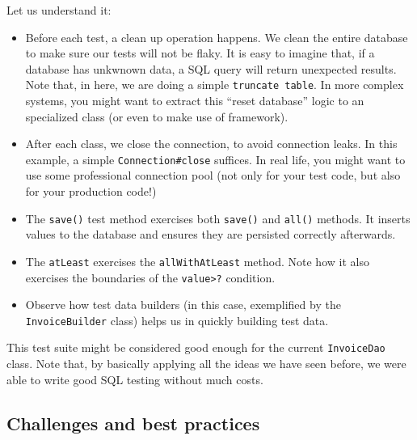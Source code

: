 \begin{Shaded}
\begin{Highlighting}[]

\NormalTok{    \}}
\NormalTok{\}}
\end{Highlighting}
\end{Shaded}

Let us understand it:

\begin{itemize}
\tightlist
\item
  Before each test, a clean up operation happens. We clean the entire
  database to make sure our tests will not be flaky. It is easy to
  imagine that, if a database has unkwnown data, a SQL query will return
  unexpected results. Note that, in here, we are doing a simple
  \texttt{truncate\ table}. In more complex systems, you might want to
  extract this ``reset database'' logic to an specialized class (or even
  to make use of framework).
\item
  After each class, we close the connection, to avoid connection leaks.
  In this example, a simple \texttt{Connection\#close} suffices. In real
  life, you might want to use some professional connection pool (not
  only for your test code, but also for your production code!)
\item
  The \texttt{save()} test method exercises both \texttt{save()} and
  \texttt{all()} methods. It inserts values to the database and ensures
  they are persisted correctly afterwards.
\item
  The \texttt{atLeast} exercises the \texttt{allWithAtLeast} method.
  Note how it also exercises the boundaries of the
  \texttt{value\textgreater{}?} condition.
\item
  Observe how test data builders (in this case, exemplified by the
  \texttt{InvoiceBuilder} class) helps us in quickly building test data.
\end{itemize}

This test suite might be considered good enough for the current
\texttt{InvoiceDao} class. Note that, by basically applying all the
ideas we have seen before, we were able to write good SQL testing
without much costs.

\hypertarget{challenges-and-best-practices}{%
\subsection{Challenges and best
practices}\label{challenges-and-best-practices}}

